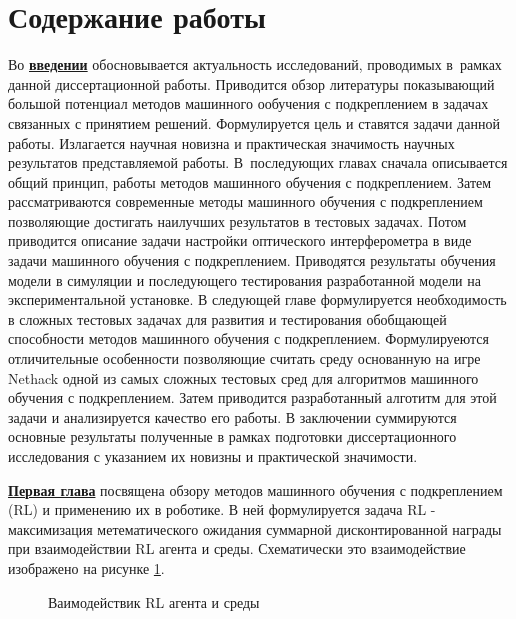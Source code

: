 \section*{Содержание работы}
Во \underline{\textbf{введении}} обосновывается актуальность
исследований, проводимых в~рамках данной диссертационной работы. Приводится обзор литературы показывающий большой потенциал методов машинного ообучения с подкреплением в задачах связанных с принятием решений. Формулируется цель и ставятся задачи данной работы. Излагается научная новизна
и практическая значимость научных результатов представляемой работы. 
В~последующих главах сначала описывается общий принцип, работы методов машинного обучения с подкреплением. Затем рассматриваются современные методы машинного обучения с подкреплением позволяющие достигать наилучших результатов в тестовых задачах. Потом приводится описание задачи настройки оптического интерферометра в виде задачи машинного обучения с подкреплением. Приводятся результаты обучения модели в симуляции и последующего тестирования разработанной модели на экспериментальной установке. В следующей главе формулируется необходимость в сложных тестовых задачах для развития и тестирования обобщающей способности методов машинного обучения с подкреплением. Формулируеются отличительные особенности позволяющие считать среду основанную на игре Nethack одной из самых сложных тестовых сред для алгоритмов машинного обучения с подкреплением. Затем приводится разработанный алготитм для этой задачи и анализируется качество его работы. В заключении суммируются основные результаты полученные в рамках подготовки диссертационного исследования с указанием их новизны и практической значимости. 


\underline{\textbf{Первая глава}} посвящена обзору методов машинного обучения с подкреплением (RL) и применению их в роботике. В ней формулируется задача RL - максимизация метематического ожидания суммарной дисконтированной награды при взаимодействии RL агента и среды. Схематически это взаимодействие изображено на рисунке \ref{fig:rl_setting}.

\begin{figure}[ht]
    \caption{Ваимодействик RL агента и среды}\label{fig:rl_setting}
\end{figure}

